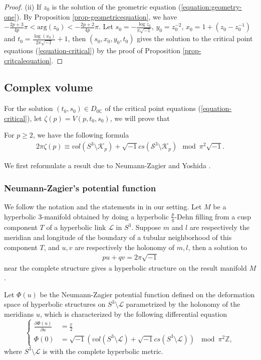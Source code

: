 \documentclass[12pt]{amsart}
\begin{document}
\begin{proof}
(ii) If $z_0$ is the solution of the geometric equation (\ref{equation:geometry-one}).
By Proposition \ref{prop-geometricequation}, we have
$ -\frac{2p+3}{4p}\pi<\text{arg}(z_0)<-\frac{2p+2}{4p}\pi.$ Let $s_0=-\frac{\log z_0}{\pi \sqrt{-1}}$, $y_0=z_0^{-2}$, $x_0=1+(z_0-z_0^{-1})$ and $t_0=\frac{\log(x_0)}{2\pi\sqrt{-1}}+1$, then $(s_0,x_0,y_0,t_0)$ gives the solution to the critical point equations (\ref{equation-critical})
by the proof of Proposition \ref{prop-critcalequation}. 
\end{proof}



\subsection{Complex volume}
For the solution $(t_0,s_0)\in D_{0\mathbb{C}}$ of the critical point equations (\ref{equation-critical}), let $\zeta(p)=V(p,t_0,s_0)$,
we will prove that 
\begin{theorem} \label{theorem-zeta=volume}
For $p\geq 2$, we have the following formula
    \begin{align}
        2\pi \zeta(p)\equiv vol(S^3\setminus \mathcal{K}_p)+\sqrt{-1}cs(\mathcal{S}^3\setminus \mathcal{K}_p) \mod \pi^2\sqrt{-1}.
    \end{align}
\end{theorem}
We first reformulate a result due to Neumann-Zagier \cite{NZ85} and Yoshida \cite{Yoshida85}. 
\subsubsection{Neumann-Zagier's potential function}
We follow the notation and the statements in \cite{WongYang20-1,WongYang20-2} in our setting.  
Let $M$ be a hyperbolic 3-manifold obtained by doing a hyperbolic $\frac{p}{q}$-Dehn filling from a cusp component $T$ of a hyperbolic link $\mathcal{L}$ in $S^3$. Suppose $m$ and $l$ are respectively the meridian and longitude of the boundary of a tubular neighborhood of this component $T$, and $u,v$  are respectively the holonomy of $m,l$, then a solution to 
\begin{align}
    pu+qv=2\pi\sqrt{-1}
\end{align}
near the complete structure gives a hyperbolic structure on the result manifold $M$. 

Let $\Phi(u)$ be the Neumann-Zagier potential function defined on the deformation space of hyperbolic structures on $S^3\setminus \mathcal{L}$ parametrized by the holonomy of the meridians $u$, which is characterized by the following differential equation
\begin{equation} \label{equation:NZpotentialfunction}
\left\{ \begin{aligned}
         \frac{\partial \Phi(u)}{\partial u} &= \frac{v}{2} \\
                  \Phi(0)&=\sqrt{-1}(vol(S^3\setminus \mathcal{L})+\sqrt{-1}cs(S^3\setminus \mathcal{L})) \ \mod \pi^2\mathbb{Z},
                          \end{aligned} \right.
                          \end{equation}
where $S^3\setminus \mathcal{L}$ is with the complete hyperbolic metric.
\end{document}
